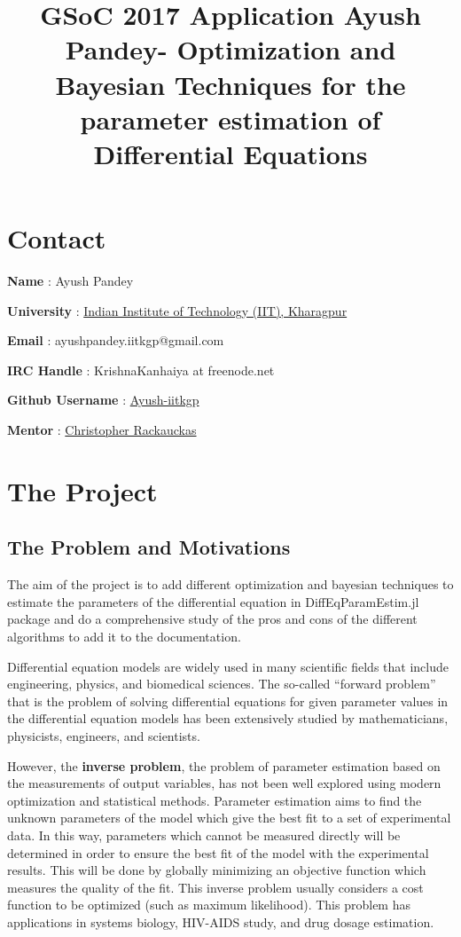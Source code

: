 \documentclass[11pt]{article}
\title{GSoC 2017 Application Ayush Pandey- Optimization and Bayesian Techniques for the parameter estimation of Differential Equations}
\begin{document}
    
    
    \maketitle
    
    

    
    \section{Contact}\label{contact}

\textbf{Name} : Ayush Pandey

\textbf{University} : \href{http://iitkgp.ac.in}{Indian Institute of
Technology (IIT), Kharagpur}

\textbf{Email} : ayushpandey.iitkgp@gmail.com

\textbf{IRC Handle} : KrishnaKanhaiya at freenode.net

\textbf{Github Username} :
\href{https://github.com/Ayush-iitkgp}{Ayush-iitkgp}

\textbf{Mentor} : \href{https://github.com/ChrisRackauckas}{Christopher
Rackauckas}

    \section{The Project}\label{the-project}

\subsection{The Problem and
Motivations}\label{the-problem-and-motivations}

The aim of the project is to add different optimization and bayesian
techniques to estimate the parameters of the differential equation in
DiffEqParamEstim.jl package and do a comprehensive study of the pros and
cons of the different algorithms to add it to the documentation.

Differential equation models are widely used in many scientific fields
that include engineering, physics, and biomedical sciences. The
so-called ``forward problem'' that is the problem of solving
differential equations for given parameter values in the differential
equation models has been extensively studied by mathematicians,
physicists, engineers, and scientists.

However, the \textbf{inverse problem}, the problem of parameter
estimation based on the measurements of output variables, has not been
well explored using modern optimization and statistical methods.
Parameter estimation aims to find the unknown parameters of the model
which give the best fit to a set of experimental data. In this way,
parameters which cannot be measured directly will be determined in order
to ensure the best fit of the model with the experimental results. This
will be done by globally minimizing an objective function which measures
the quality of the fit. This inverse problem usually considers a cost
function to be optimized (such as maximum likelihood). This problem has
applications in systems biology, HIV-AIDS study, and drug dosage
estimation.
\end{document}

